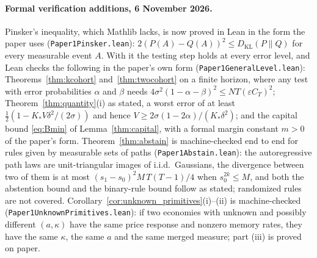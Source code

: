 \documentclass[12pt]{article}
\theoremstyle{definition}
\theoremstyle{remark}
\newcommand{\KL}{D_{\mathrm{KL}}}
\begin{document}
\paragraph{Formal verification additions, 6 November 2026.} Pinsker's inequality, which Mathlib lacks, is now proved in Lean in the form the paper uses (\nolinkurl{Paper1Pinsker.lean}): $2(P(A)-Q(A))^2\le\KL(P\|Q)$ for every measurable event $A$. With it the testing step holds at every error level, and Lean checks the following in the paper's own form (\nolinkurl{Paper1GeneralLevel.lean}): Theorems~\ref{thm:kcohort} and~\ref{thm:twocohort} on a finite horizon, where any test with error probabilities $\alpha$ and $\beta$ needs $4\sigma^2(1-\alpha-\beta)^2\le NT(\varepsilon C_T)^2$; Theorem~\ref{thm:quantity}(i) as stated, a worst error of at least $\tfrac12(1-K_*V\delta^2/(2\sigma))$ and hence $V\ge2\sigma(1-2\alpha)/(K_*\delta^2)$; and the capital bound \eqref{eq:Bmin} of Lemma~\ref{thm:capital}, with a formal margin constant $m>0$ of the paper's form. Theorem~\ref{thm:abstain} is machine-checked end to end for rules given by measurable sets of paths (\nolinkurl{Paper1Abstain.lean}): the autoregressive path laws are unit-triangular images of i.i.d.\ Gaussians, the divergence between two of them is at most $(s_1-s_0)^2M\,T(T-1)/4$ when $s_0^{2k}\le M$, and both the abstention bound and the binary-rule bound follow as stated; randomized rules are not covered. Corollary~\ref{cor:unknown_primitives}(i)--(ii) is machine-checked (\nolinkurl{Paper1UnknownPrimitives.lean}): if two economies with unknown and possibly different $(a,\kappa)$ have the same price response and nonzero memory rates, they have the same $\kappa$, the same $a$ and the same merged measure; part (iii) is proved on paper.
\end{document}
